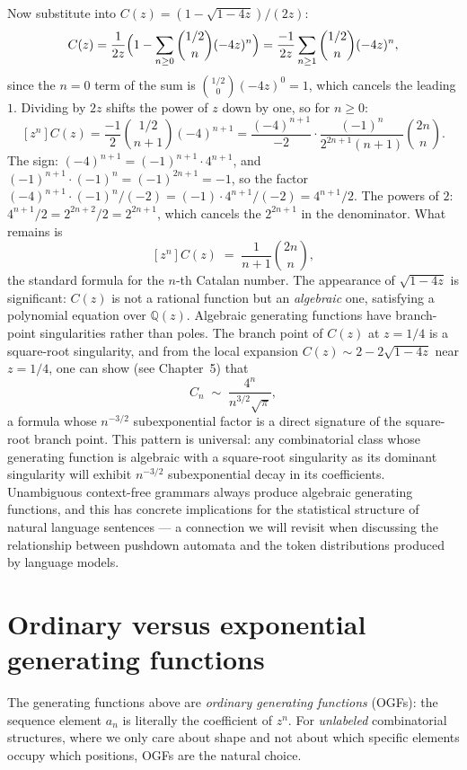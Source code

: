 Now substitute into $C(z) = (1-\sqrt{1-4z})/(2z)$:
\[
  C(z) = \frac{1}{2z}\Bigl(1 - \sum_{n \ge 0}\binom{1/2}{n}(-4z)^n\Bigr)
  = \frac{-1}{2z}\sum_{n \ge 1}\binom{1/2}{n}(-4z)^n,
\]
since the $n=0$ term of the sum is $\binom{1/2}{0}(-4z)^0 = 1$, which cancels the leading $1$. Dividing by $2z$ shifts the power of $z$ down by one, so for $n \ge 0$:
\[
  [z^n]C(z) = \frac{-1}{2}\binom{1/2}{n+1}(-4)^{n+1}
  = \frac{(-4)^{n+1}}{-2} \cdot \frac{(-1)^{n}}{2^{2n+1}(n+1)}\binom{2n}{n}.
\]
The sign: $(-4)^{n+1} = (-1)^{n+1} \cdot 4^{n+1}$, and $(-1)^{n+1} \cdot (-1)^n = (-1)^{2n+1} = -1$, so the factor $(-4)^{n+1} \cdot (-1)^n / (-2) = (-1)\cdot 4^{n+1}/(-2) = 4^{n+1}/2$. The powers of $2$: $4^{n+1}/2 = 2^{2n+2}/2 = 2^{2n+1}$, which cancels the $2^{2n+1}$ in the denominator. What remains is
\[
  [z^n] C(z) \;=\; \frac{1}{n+1}\binom{2n}{n},
\]
the standard formula for the $n$-th Catalan number. The appearance of $\sqrt{1-4z}$ is significant: $C(z)$ is not a rational function but an \emph{algebraic} one, satisfying a polynomial equation over $\mathbb{Q}(z)$. Algebraic generating functions have branch-point singularities rather than poles. The branch point of $C(z)$ at $z = 1/4$ is a square-root singularity, and from the local expansion $C(z) \sim 2 - 2\sqrt{1-4z}$ near $z = 1/4$, one can show (see Chapter~5) that
\[
  C_n \;\sim\; \frac{4^n}{n^{3/2}\sqrt{\pi}},
\]
a formula whose $n^{-3/2}$ subexponential factor is a direct signature of the square-root branch point. This pattern is universal: any combinatorial class whose generating function is algebraic with a square-root singularity as its dominant singularity will exhibit $n^{-3/2}$ subexponential decay in its coefficients. Unambiguous context-free grammars always produce algebraic generating functions, and this has concrete implications for the statistical structure of natural language sentences --- a connection we will revisit when discussing the relationship between pushdown automata and the token distributions produced by language models.

\section*{Ordinary versus exponential generating functions}

The generating functions above are \emph{ordinary generating functions} (OGFs): the sequence element $a_n$ is literally the coefficient of $z^n$. For \emph{unlabeled} combinatorial structures, where we only care about shape and not about which specific elements occupy which positions, OGFs are the natural choice.

